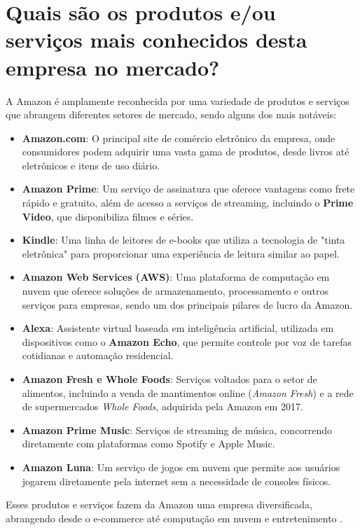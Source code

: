 \section{Quais são os produtos e/ou serviços mais conhecidos desta empresa no mercado?}

A Amazon é amplamente reconhecida por uma variedade de produtos e serviços que abrangem diferentes setores de mercado, sendo alguns dos mais notáveis:

\begin{itemize}
    \item \textbf{Amazon.com}: O principal site de comércio eletrônico da empresa, onde consumidores podem adquirir uma vasta gama de produtos, desde livros até eletrônicos e itens de uso diário.
    \item \textbf{Amazon Prime}: Um serviço de assinatura que oferece vantagens como frete rápido e gratuito, além de acesso a serviços de streaming, incluindo o \textbf{Prime Video}, que disponibiliza filmes e séries.
    \item \textbf{Kindle}: Uma linha de leitores de e-books que utiliza a tecnologia de "tinta eletrônica" para proporcionar uma experiência de leitura similar ao papel.
    \item \textbf{Amazon Web Services (AWS)}: Uma plataforma de computação em nuvem que oferece soluções de armazenamento, processamento e outros serviços para empresas, sendo um dos principais pilares de lucro da Amazon.
    \item \textbf{Alexa}: Assistente virtual baseada em inteligência artificial, utilizada em dispositivos como o \textbf{Amazon Echo}, que permite controle por voz de tarefas cotidianas e automação residencial.
    \item \textbf{Amazon Fresh e Whole Foods}: Serviços voltados para o setor de alimentos, incluindo a venda de mantimentos online (\textit{Amazon Fresh}) e a rede de supermercados \textit{Whole Foods}, adquirida pela Amazon em 2017.
    \item \textbf{Amazon Prime Music}: Serviços de streaming de música, concorrendo diretamente com plataformas como Spotify e Apple Music.
    \item \textbf{Amazon Luna}: Um serviço de jogos em nuvem que permite aos usuários jogarem diretamente pela internet sem a necessidade de consoles físicos.
\end{itemize}

Esses produtos e serviços fazem da Amazon uma empresa diversificada, abrangendo desde o e-commerce até computação em nuvem e entretenimento \cite{amazon2024products}.

